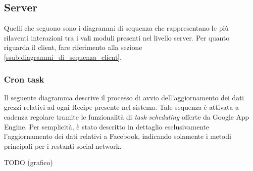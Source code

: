%


\subsection{Server} %
\label{ssub:diagrammi_di_sequenza_server}
Quelli che seguono sono i diagrammi di sequenza che rappresentano le più rilaventi interazioni tra i vali moduli presenti nel livello server. Per quanto riguarda il client, fare riferimento alla sezione \ref{ssub:diagrammi_di_sequenza_client}.

    \subsubsection{Cron task} %
    \label{ssub:cron_task}
    Il seguente diagramma descrive il processo di avvio dell'aggiornamento dei dati grezzi relativi ad ogni Recipe presente nel sistema. Tale sequenza è attivata a cadenza regolare tramite le funzionalità di \textit{task scheduling} offerte da Google App Engine. Per semplicità, è stato descritto in dettaglio esclusivamente l'aggiornamento dei dati relativi a Facebook, indicando solamente i metodi principali per i restanti social network. \newline

    TODO (grafico) \newline
    \noindent


